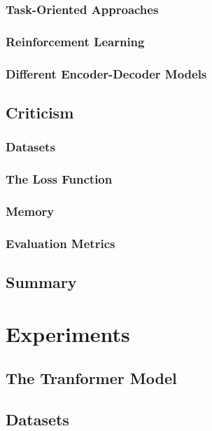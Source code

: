 \documentclass[12pt]{article}
\begin{document}
\subsubsection{Task-Oriented Approaches} \label{sssec:task}
\subsubsection{Reinforcement Learning} \label{sssec:RL}

\subsubsection{Different Encoder-Decoder Models} \label{sssec:diffencdec}

\subsection{Criticism} \label{ssec:problems}
\subsubsection{Datasets}
\subsubsection{The Loss Function}
\subsubsection{Memory}
\subsubsection{Evaluation Metrics} \label{sssec:metrics}

\subsection{Summary} \label{ssec:summary}
    

\newpage\section{Experiments} \label{sec:experiments}
\subsection{The Tranformer Model} \label{ssec:41}
\subsection{Datasets} \label{ssec:42}
\end{document}
